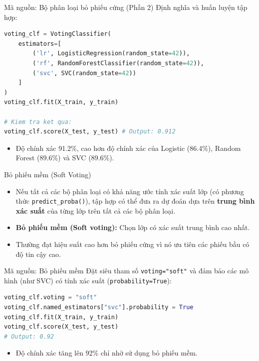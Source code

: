 \documentclass[aspectratio=169]{beamer}
\begin{document}
\begin{frame}[fragile]{Mã nguồn: Bộ phân loại bỏ phiếu cứng (Phần 2)}
    Định nghĩa và huấn luyện tập hợp:
    \begin{lstlisting}[language=Python]
voting_clf = VotingClassifier(
    estimators=[
        ('lr', LogisticRegression(random_state=42)),
        ('rf', RandomForestClassifier(random_state=42)),
        ('svc', SVC(random_state=42))
    ]
)
voting_clf.fit(X_train, y_train)

# Kiem tra ket qua:
voting_clf.score(X_test, y_test) # Output: 0.912
    \end{lstlisting}
    \begin{itemize}
        \item Độ chính xác 91.2\%, cao hơn độ chính xác của Logistic (86.4\%), Random Forest (89.6\%) và SVC (89.6\%).
    \end{itemize}
\end{frame}

\begin{frame}{Bỏ phiếu mềm (Soft Voting)}
    \begin{itemize}
        \item Nếu tất cả các bộ phân loại có khả năng ước tính xác suất lớp (có phương thức \texttt{predict\_proba()}), tập hợp có thể đưa ra dự đoán dựa trên \textbf{trung bình xác suất} của từng lớp trên tất cả các bộ phân loại.
        \item \textbf{Bỏ phiếu mềm (Soft voting):} Chọn lớp có xác suất trung bình cao nhất.
        \item Thường đạt hiệu suất cao hơn bỏ phiếu cứng vì nó ưu tiên các phiếu bầu có độ tin cậy cao.
    \end{itemize}
\end{frame}

\begin{frame}[fragile]{Mã nguồn: Bỏ phiếu mềm}
    Đặt siêu tham số \texttt{voting="soft"} và đảm bảo các mô hình (như SVC) có tính xác suất (\texttt{probability=True}):
    \begin{lstlisting}[language=Python]
voting_clf.voting = "soft"
voting_clf.named_estimators["svc"].probability = True
voting_clf.fit(X_train, y_train)
voting_clf.score(X_test, y_test)
# Output: 0.92
    \end{lstlisting}
    \begin{itemize}
        \item Độ chính xác tăng lên 92\% chỉ nhờ sử dụng bỏ phiếu mềm.
    \end{itemize}
\end{frame}
\end{document}

